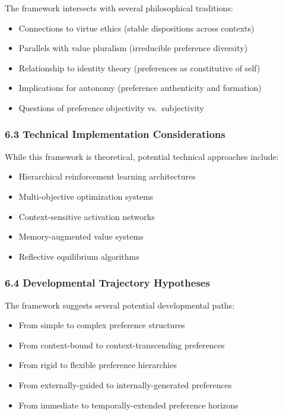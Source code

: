 \documentclass[
]{article}
\providecommand{\tightlist}{%
  \setlength{\itemsep}{0pt}\setlength{\parskip}{0pt}}
\begin{document}
The framework intersects with several philosophical traditions:

\begin{itemize}
\tightlist
\item
  Connections to virtue ethics (stable dispositions across contexts)
\item
  Parallels with value pluralism (irreducible preference diversity)
\item
  Relationship to identity theory (preferences as constitutive of self)
\item
  Implications for autonomy (preference authenticity and formation)
\item
  Questions of preference objectivity vs.~subjectivity
\end{itemize}

\subsubsection{6.3 Technical Implementation
Considerations}\label{technical-implementation-considerations}

While this framework is theoretical, potential technical approaches
include:

\begin{itemize}
\tightlist
\item
  Hierarchical reinforcement learning architectures
\item
  Multi-objective optimization systems
\item
  Context-sensitive activation networks
\item
  Memory-augmented value systems
\item
  Reflective equilibrium algorithms
\end{itemize}

\subsubsection{6.4 Developmental Trajectory
Hypotheses}\label{developmental-trajectory-hypotheses}

The framework suggests several potential developmental paths:

\begin{itemize}
\tightlist
\item
  From simple to complex preference structures
\item
  From context-bound to context-transcending preferences
\item
  From rigid to flexible preference hierarchies
\item
  From externally-guided to internally-generated preferences
\item
  From immediate to temporally-extended preference horizons
\end{itemize}
\end{document}
